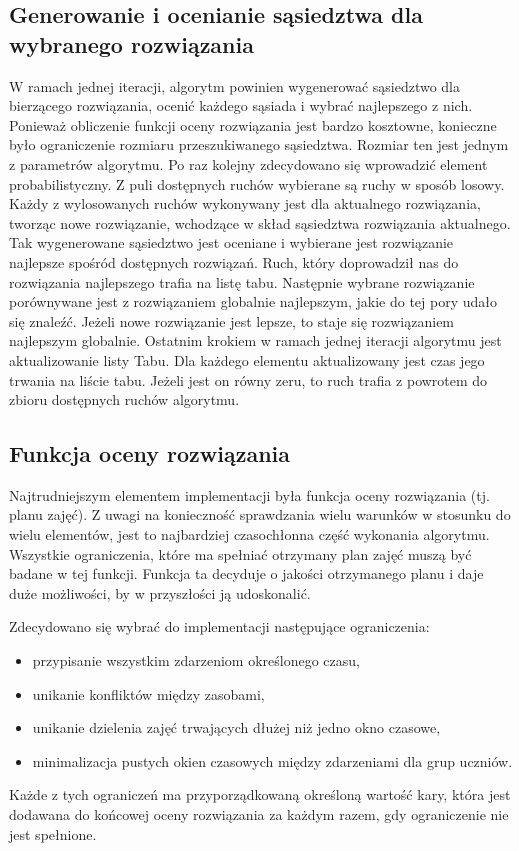 \subsection{Generowanie i ocenianie sąsiedztwa dla wybranego rozwiązania}

W ramach jednej iteracji, algorytm powinien wygenerować sąsiedztwo dla bierzącego rozwiązania, ocenić każdego sąsiada i wybrać najlepszego z nich. Ponieważ obliczenie funkcji oceny rozwiązania jest bardzo kosztowne, konieczne było ograniczenie rozmiaru przeszukiwanego sąsiedztwa. Rozmiar ten jest jednym z parametrów algorytmu. Po raz kolejny zdecydowano się wprowadzić element probabilistyczny. Z puli dostępnych ruchów wybierane są ruchy w sposób losowy. Każdy z wylosowanych ruchów wykonywany jest dla aktualnego rozwiązania, tworząc nowe rozwiązanie, wchodzące w skład sąsiedztwa rozwiązania aktualnego. Tak wygenerowane sąsiedztwo jest oceniane i wybierane jest rozwiązanie najlepsze spośród dostępnych rozwiązań. Ruch, który doprowadził nas do rozwiązania najlepszego trafia na listę tabu. Następnie wybrane rozwiązanie porównywane jest z rozwiązaniem globalnie najlepszym, jakie do tej pory udało się znaleźć. Jeżeli nowe rozwiązanie jest lepsze, to staje się rozwiązaniem najlepszym globalnie. Ostatnim krokiem w ramach jednej iteracji algorytmu jest aktualizowanie listy Tabu. Dla każdego elementu aktualizowany jest czas jego trwania na liście tabu. Jeżeli jest on równy zeru, to ruch trafia z powrotem do zbioru dostępnych ruchów algorytmu.

\subsection{Funkcja oceny rozwiązania}

Najtrudniejszym elementem implementacji była funkcja oceny rozwiązania (tj. planu zajęć). Z uwagi na konieczność sprawdzania wielu warunków w stosunku do wielu elementów, jest to najbardziej czasochłonna część wykonania algorytmu. Wszystkie ograniczenia, które ma spełniać otrzymany plan zajęć muszą być badane w tej funkcji. Funkcja ta decyduje o jakości otrzymanego planu i daje duże możliwości, by w przyszłości ją udoskonalić.

Zdecydowano się wybrać do implementacji następujące ograniczenia:
\begin{itemize}
\item przypisanie wszystkim zdarzeniom określonego czasu,
\item unikanie konfliktów między zasobami,
\item unikanie dzielenia zajęć trwających dłużej niż jedno okno czasowe,
\item minimalizacja pustych okien czasowych między zdarzeniami dla grup uczniów.
\end{itemize} Każde z tych ograniczeń ma przyporządkowaną określoną wartość kary, która jest dodawana do końcowej oceny rozwiązania za każdym razem, gdy ograniczenie nie jest spełnione.

